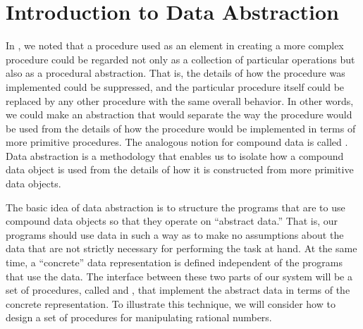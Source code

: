 \section{Introduction to Data Abstraction}
\label{Section 2.1}

In , we noted that a procedure used as an element in creating a more complex procedure could be regarded not only as a collection of particular operations but also as a procedural abstraction.
That is, the details of how the procedure was implemented could be suppressed, and the particular procedure itself could be replaced by any other procedure with the same overall behavior.
In other words, we could make an abstraction that would separate the way the procedure would be used from the details of how the procedure would be implemented in terms of more primitive procedures.
The analogous notion for compound data is called .
Data abstraction is a methodology that enables us to isolate how a compound data object is used from the details of how it is constructed from more primitive data objects.

The basic idea of data abstraction is to structure the programs that are to use compound data objects so that they operate on “abstract data.”
That is, our programs should use data in such a way as to make no assumptions about the data that are not strictly necessary for performing the task at hand.
At the same time, a “concrete” data representation is defined independent of the programs that use the data.
The interface between these two parts of our system will be a set of procedures, called  and , that implement the abstract data in terms of the concrete representation.
To illustrate this technique, we will consider how to design a set of procedures for manipulating rational numbers.





